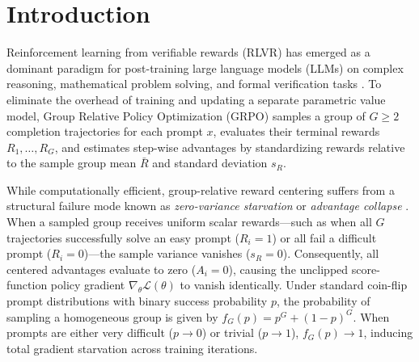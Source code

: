 \documentclass{article}
\newcommand{\grpo}{\textsc{GRPO}\xspace}
\begin{document}
\section{Introduction}
\label{sec:introduction}

Reinforcement learning from verifiable rewards (RLVR) has emerged as a dominant paradigm for post-training large language models (LLMs) on complex reasoning, mathematical problem solving, and formal verification tasks \citep{shao2024deepseekmath, cobbe2021gsm8k, hendrycks2021math}. To eliminate the overhead of training and updating a separate parametric value model, Group Relative Policy Optimization (\grpo) samples a group of $G \ge 2$ completion trajectories for each prompt $x$, evaluates their terminal rewards $R_1, \dots, R_G$, and estimates step-wise advantages by standardizing rewards relative to the sample group mean $\bar{R}$ and standard deviation $s_R$.

While computationally efficient, group-relative reward centering suffers from a structural failure mode known as \emph{zero-variance starvation} or \emph{advantage collapse} \citep{nie2026gradient, he2026advantage}. When a sampled group receives uniform scalar rewards—such as when all $G$ trajectories successfully solve an easy prompt ($R_i = 1$) or all fail a difficult prompt ($R_i = 0$)—the sample variance vanishes ($s_R = 0$). Consequently, all centered advantages evaluate to zero ($A_i = 0$), causing the unclipped score-function policy gradient $\nabla_\theta \mathcal{L}(\theta)$ to vanish identically. Under standard coin-flip prompt distributions with binary success probability $p$, the probability of sampling a homogeneous group is given by $f_G(p) = p^G + (1-p)^G$. When prompts are either very difficult ($p \to 0$) or trivial ($p \to 1$), $f_G(p) \to 1$, inducing total gradient starvation across training iterations.
\end{document}
